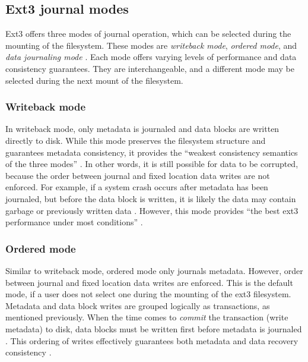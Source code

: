 \subsection{Ext3 journal modes}

Ext3 offers three modes of journal operation, which can be selected during the mounting of the filesystem. These modes are \emph{writeback mode}, \emph{ordered mode}, and \emph{data journaling mode} \citep{Prabhakaran2005a, Jones2008, Mauerer2008}. Each mode offers varying levels of performance and data consistency guarantees. They are interchangeable, and a different mode may be selected during the next mount of the filesystem.

\subsubsection{Writeback mode}

In writeback mode, only metadata is journaled and data blocks are written directly to disk. While this mode preserves the filesystem structure and guarantees metadata consistency, it provides the ``weakest consistency semantics of the three modes'' \citep[p. 108]{Prabhakaran2005a}. In other words, it is still possible for data to be corrupted, because the order between journal and fixed location data writes are not enforced. For example, if a system crash occurs after metadata has been journaled, but before the data block is written, it is likely the data may contain garbage or previously written data \citep{Jones2008, Prabhakaran2005a}. However, this mode provides ``the best ext3 performance under most conditions'' \citep[p. 2]{Robbins2001b}.

\subsubsection{Ordered mode}

Similar to writeback mode, ordered mode only journals metadata. However, order between journal and fixed location data writes are enforced. This is the default mode, if a user does not select one during the mounting of the ext3 filesystem. Metadata and data block writes are grouped logically as transactions, as mentioned previously. When the time comes to \emph{commit} the transaction (write metadata) to disk, data blocks must be written first before metadata is journaled \citep{Robbins2001b}. This ordering of writes effectively guarantees both metadata and data recovery consistency \citep{Jones2008, Prabhakaran2005a}.

